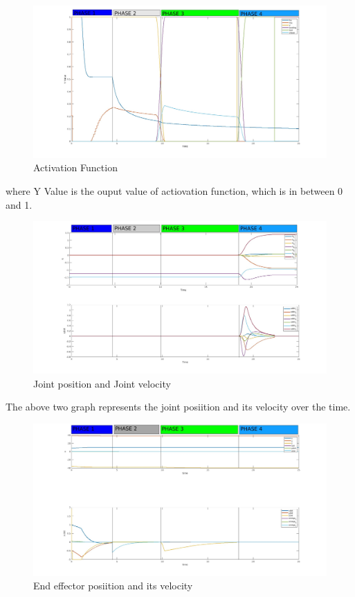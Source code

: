 \documentclass{article}
\begin{document}
\begin{figure}[h]
	\centering
	\includegraphics[width=1\textwidth]{imgs/ex1/activation function labled.jpg}
	\caption{\label{fig:1} Activation Function}
\end{figure}
\noindent
where Y Value is the ouput value of actiovation function, which is in between 0 and 1. 

\begin{figure}[h]
	\centering
	\includegraphics[width=1\textwidth]{imgs/ex1/q and qdot labelled.jpg}
	\caption{\label{fig:2} Joint position and Joint velocity} 
\end{figure}
The above two graph represents the joint posiition and its velocity over the time. 
\begin{figure}[h]
	\centering
	\includegraphics[width=1\textwidth]{imgs/ex1/x and xdot labelled.jpg}
	\caption{\label{fig:1}End effector posiition and its velocity} 
\end{figure}
\end{document}
